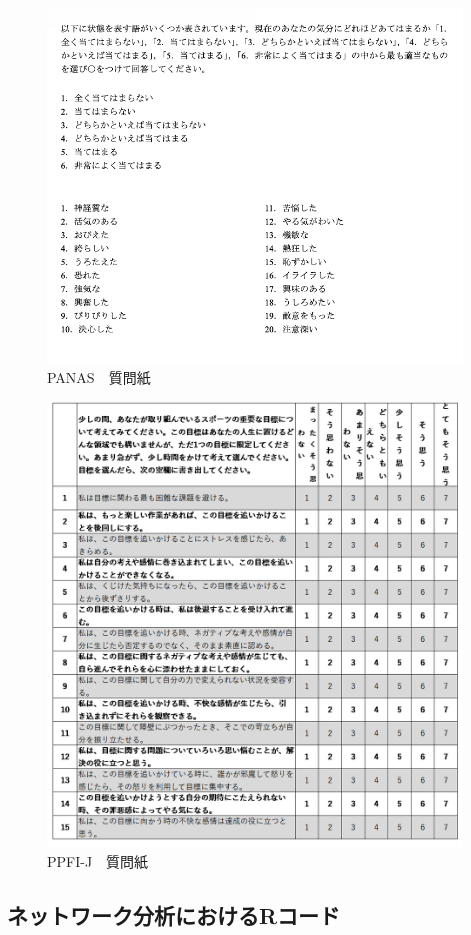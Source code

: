 \documentclass[12pt,a4paper,xelatex,ja=standard]{bxjsarticle}
\begin{document}
\begin{figure}[H]
\centering
\includegraphics[clip,width = 11cm]{question/pq.png}
\caption{PANAS　質問紙}
\end{figure}

\begin{figure}[H]
\centering
\includegraphics[clip,width = 11cm]{question/ppfiq.png}
\caption{PPFI-J　質問紙}
\end{figure}

\clearpage

\hypertarget{ux30cdux30c3ux30c8ux30efux30fcux30afux5206ux6790ux306bux304aux3051ux308brux30b3ux30fcux30c9}{%
\subsection{ネットワーク分析におけるRコード}\label{ux30cdux30c3ux30c8ux30efux30fcux30afux5206ux6790ux306bux304aux3051ux308brux30b3ux30fcux30c9}}
\end{document}
